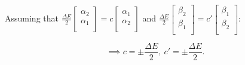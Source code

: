 \documentclass{article}
\begin{document}
Assuming that $\frac{\Delta E}{2} \begin{bmatrix}
    \alpha_2 \\
    \alpha_1 \\
\end{bmatrix} = c \begin{bmatrix}
    \alpha_1 \\
    \alpha_2 \\
\end{bmatrix}$ and $\frac{\Delta E}{2} \begin{bmatrix}
    \beta_2 \\
    \beta_1 \\
\end{bmatrix} = c' \begin{bmatrix}
    \beta_1 \\
    \beta_2 \\
\end{bmatrix}$:

$$ \implies c = \pm \frac{\Delta E}{2}, \ c' = \pm \frac{\Delta E}{2}.$$
\end{document}
